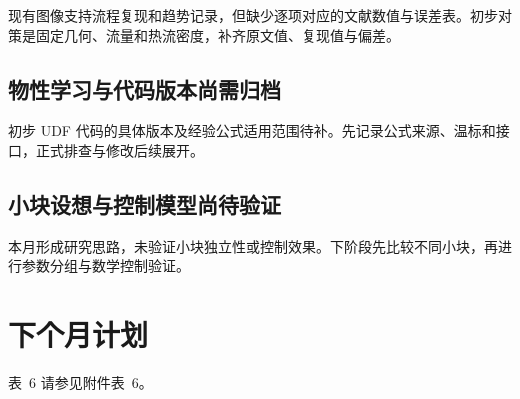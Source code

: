 \documentclass[stage1,fontset=fandol]{ydzjreport}
\makeatletter
\newcommand{\submissionnumber}[1]{\def\@currentlabel{#1}}
\makeatother
\begin{document}
现有图像支持流程复现和趋势记录，但缺少逐项对应的文献数值与误差表。初步对策是固定几何、流量和热流密度，补齐原文值、复现值与偏差。

\subsection{物性学习与代码版本尚需归档}

初步 UDF 代码的具体版本及经验公式适用范围待补。先记录公式来源、温标和接口，正式排查与修改后续展开。

\subsection{小块设想与控制模型尚待验证}

本月形成研究思路，未验证小块独立性或控制效果。下阶段先比较不同小块，再进行参数分组与数学控制验证。

\section{下个月计划}


\par\noindent \begingroup\submissionnumber{6}\label{tab:plan}\endgroup 表~6 请参见附件表~6。\par
\end{document}
